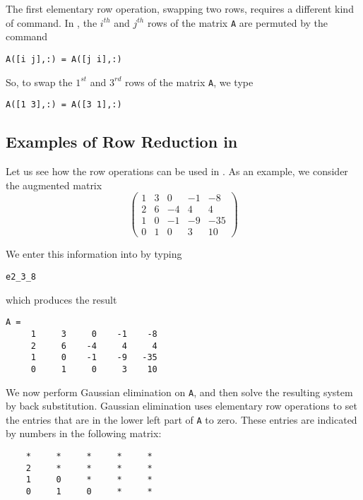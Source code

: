 The first elementary row operation, swapping two rows, requires
a different kind of \Matlab command.  In \Matlabp, the $i^{th}$
and $j^{th}$ rows of the matrix {\tt A} are permuted by the
command
\begin{verbatim}
A([i j],:) = A([j i],:)
\end{verbatim}
So, to swap the $1^{st}$ and $3^{rd}$ rows of the matrix
{\tt A}, we type
\begin{verbatim}
A([1 3],:) = A([3 1],:)
\end{verbatim}  

\subsection*{Examples of Row Reduction in \Matlab}

Let us see how the row operations can be used in \Matlabp.  As
an example, we consider the augmented matrix
\begin{equation*}  \label{examp4}
\left(
\begin{array}{rrrr|r}
 1  &  3  &  0  & -1  &  -8\\
 2  &  6  & -4  &  4  &   4\\
 1  &  0  & -1  & -9  & -35\\
 0  &  1  &  0  &  3  &  10
\end{array}
\right)
\end{equation*}

We enter this information into \Matlab by typing
\begin{verbatim}
e2_3_8
\end{verbatim}
which produces the result
\begin{verbatim}
A =
     1     3     0    -1    -8
     2     6    -4     4     4
     1     0    -1    -9   -35
     0     1     0     3    10
\end{verbatim}

We now perform Gaussian elimination on {\tt A}, and then solve the 
resulting system by back substitution.  Gaussian elimination uses 
elementary row operations to set the entries that are in the lower 
left part of {\tt A} to zero. These entries are indicated by
numbers in the following matrix:
\begin{verbatim}
    *     *     *     *     *
    2     *     *     *     *
    1     0     *     *     *
    0     1     0     *     *
\end{verbatim}

